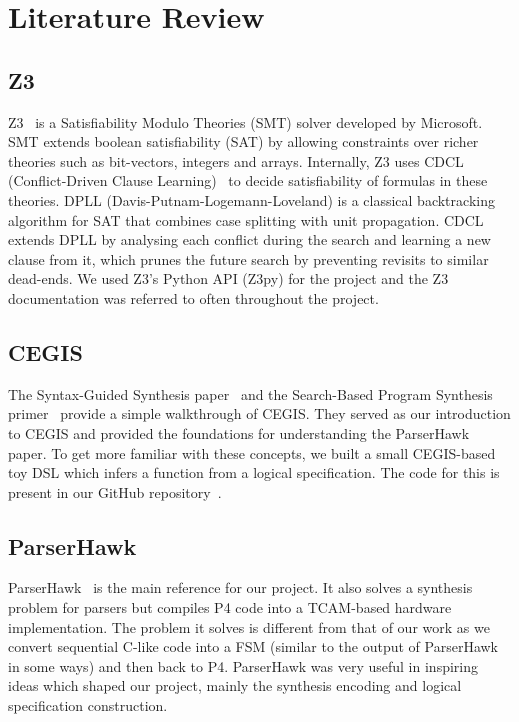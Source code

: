\chapter{Literature Review}
\label{ch:literature}

\section{Z3}
\label{sec:lit-z3}

Z3~\cite{z3_tutorial} is a Satisfiability Modulo Theories (SMT)
solver developed by Microsoft. SMT extends boolean satisfiability
(SAT) by allowing constraints over richer theories such as
bit-vectors, integers and arrays. Internally, Z3 uses CDCL
(Conflict-Driven Clause Learning)~\cite{cdcl_handbook} to decide
satisfiability of formulas in these theories. DPLL
(Davis-Putnam-Logemann-Loveland) is a classical backtracking
algorithm for SAT that combines case splitting with unit
propagation. CDCL extends DPLL by analysing each conflict during
the search and learning a new clause from it, which prunes the
future search by preventing revisits to similar dead-ends. 
We used Z3's Python API (Z3py) for the project 
and the Z3 documentation was referred to often
throughout the project.

\section{CEGIS}
\label{sec:lit-cegis}

The Syntax-Guided Synthesis paper~\cite{cegis_paper} and the
Search-Based Program Synthesis primer~\cite{synth_primer} provide
a simple walkthrough of CEGIS. They served as our introduction to
CEGIS and provided the foundations for understanding the
ParserHawk paper. To get more familiar with these concepts, we
built a small CEGIS-based toy DSL which infers a function from a
logical specification. The code for this is present in our GitHub
repository~\cite{parsercompiler26_repo}.

\section{ParserHawk}
\label{sec:lit-parserhawk}

ParserHawk~\cite{parserhawk} is the main reference for our project.
It also solves a synthesis problem for parsers but compiles P4
code into a TCAM-based hardware implementation. The problem it solves is
different from that of our work as we convert
sequential C-like code into a FSM (similar to the output
of ParserHawk in some ways) and then back to P4. ParserHawk was very useful in
inspiring ideas which shaped our project, mainly the synthesis
encoding and logical specification construction.